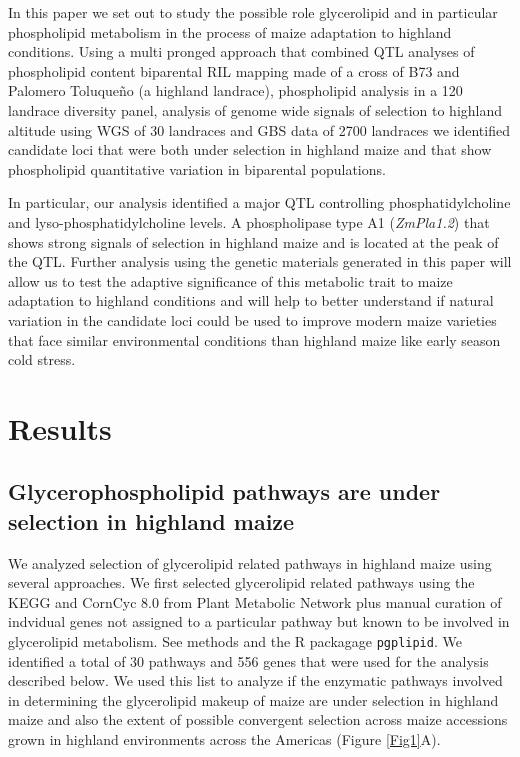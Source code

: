 \documentclass[9pt,twocolumn,twoside,lineno]{gsajnl}
\begin{document}
In this paper we set out to study the possible role glycerolipid and in particular phospholipid metabolism in the process of maize adaptation to highland conditions. 
Using a multi pronged approach that combined QTL analyses of phospholipid content biparental RIL mapping made of a cross of B73 and Palomero Toluqueño (a highland landrace), phospholipid analysis in a 120 landrace diversity panel, analysis of genome wide signals of selection to highland altitude using WGS of 30 landraces and GBS data of 2700 landraces we identified candidate loci  that were both under selection in highland maize and that show phospholipid quantitative variation  in biparental populations. 

In particular, our analysis identified a major QTL controlling phosphatidylcholine and lyso-phosphatidylcholine levels. A phospholipase type A1 (\textit{ZmPla1.2}) that shows strong signals of selection in highland maize and is located at the peak of the QTL. Further analysis using the genetic materials generated in this paper will allow us to test the adaptive significance of this metabolic trait to maize adaptation to highland conditions and will help to better understand if natural variation in the candidate loci could be used to improve modern maize varieties that face similar environmental conditions than highland maize like early season cold stress. 

\section{Results}
\label{sec:results}

\subsection{Glycerophospholipid pathways are under selection in  highland maize} 
We analyzed selection of glycerolipid related pathways in highland maize using several approaches. 
We first selected glycerolipid related pathways using the KEGG \citep{kanehisa2019} and CornCyc 8.0 from  Plant Metabolic Network \citep{Schlapfer2017-yl} plus manual curation of indvidual genes not assigned to a particular pathway but known to be involved in glycerolipid metabolism. See methods and the R packagage \verb|pgplipid|. 
We identified a total of 30 pathways and 556 genes that were used for the analysis described below. 
We used this list to analyze if the enzymatic pathways involved in determining the glycerolipid makeup of maize are under selection in highland maize and also the extent of possible convergent selection across maize accessions grown in highland environments across the Americas (Figure \ref{Fig1}A).  
\end{document}
